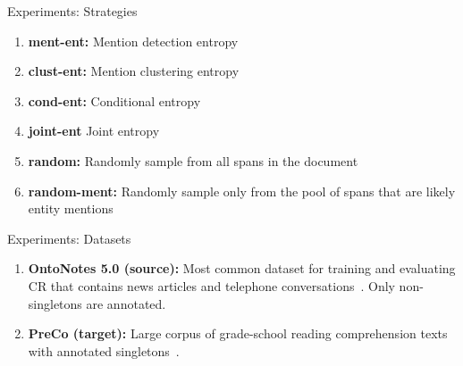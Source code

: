 \begin{frame}{Experiments: Strategies}
\begin{enumerate}
\item \textbf{ment-ent:} Mention detection entropy
\item \textbf{clust-ent:} Mention clustering entropy
\item \textbf{cond-ent:} Conditional entropy
\item \textbf{joint-ent} Joint entropy
\item \textbf{random:} Randomly sample from all spans in the document
\item \textbf{random-ment:} Randomly sample only from
    the pool of spans that are likely entity mentions
\end{enumerate}
\end{frame}
\begin{frame}{Experiments: Datasets}
    \begin{enumerate}
        \item \textbf{OntoNotes 5.0 (source):} Most common dataset for training and evaluating
        CR that contains news articles and telephone
            conversations~\citep{pradhan-2013}. Only non-singletons are
            annotated.
        \item \textbf{PreCo (target):} Large corpus of grade-school reading comprehension
        texts with annotated singletons~\citep{chen-2018}.
    \end{enumerate}
\end{frame}

